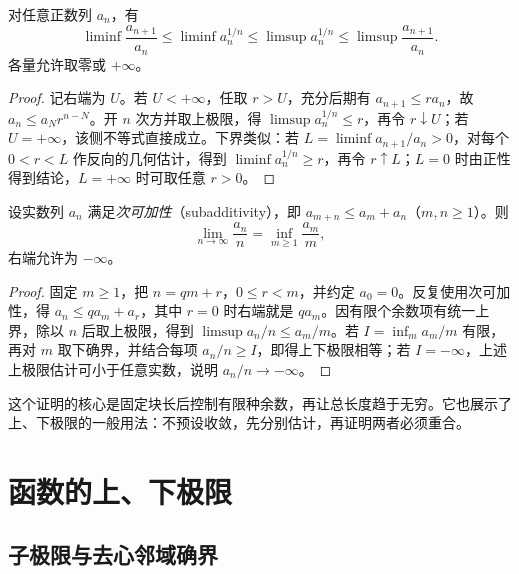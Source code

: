 \begin{proposition}
\label{prop:pei-ratio-root-limsup}
对任意正数列 $a_n$，有
\begin{equation}
    \liminf\frac{a_{n+1}}{a_n}
    \le\liminf a_n^{1/n}
    \le\limsup a_n^{1/n}
    \le\limsup\frac{a_{n+1}}{a_n}.
    \label{eq:pei-ratio-root-limsup}
\end{equation}
各量允许取零或 $+\infty$。
\end{proposition}
\begin{proof}
记右端为 $U$。若 $U<+\infty$，任取 $r>U$，充分后期有 $a_{n+1}\le r a_n$，故 $a_n\le a_Nr^{n-N}$。开 $n$ 次方并取上极限，得 $\limsup a_n^{1/n}\le r$，再令 $r\downarrow U$；若 $U=+\infty$，该侧不等式直接成立。下界类似：若 $L=\liminf a_{n+1}/a_n>0$，对每个 $0<r<L$ 作反向的几何估计，得到 $\liminf a_n^{1/n}\ge r$，再令 $r\uparrow L$；$L=0$ 时由正性得到结论，$L=+\infty$ 时可取任意 $r>0$。
\end{proof}

\begin{theorem}[次可加数列的平均极限]
\label{thm:pei-subadditive}
设实数列 $a_n$ 满足\emph{次可加性}（subadditivity），即 $a_{m+n}\le a_m+a_n$（$m,n\ge1$）。则
\begin{equation}
    \lim_{n\to\infty}\frac{a_n}{n}
       =\inf_{m\ge1}\frac{a_m}{m},
    \label{eq:pei-subadditive}
\end{equation}
右端允许为 $-\infty$。
\end{theorem}
\begin{proof}
固定 $m\ge1$，把 $n=qm+r$，$0\le r<m$，并约定 $a_0=0$。反复使用次可加性，得 $a_n\le qa_m+a_r$，其中 $r=0$ 时右端就是 $qa_m$。因有限个余数项有统一上界，除以 $n$ 后取上极限，得到 $\limsup a_n/n\le a_m/m$。若 $I=\inf_ma_m/m$ 有限，再对 $m$ 取下确界，并结合每项 $a_n/n\ge I$，即得上下极限相等；若 $I=-\infty$，上述上极限估计可小于任意实数，说明 $a_n/n\to-\infty$。
\end{proof}

这个证明的核心是固定块长后控制有限种余数，再让总长度趋于无穷。它也展示了上、下极限的一般用法：不预设收敛，先分别估计，再证明两者必须重合。

\section{函数的上、下极限}
\label{sec:pei-function-limsup}

\subsection{子极限与去心邻域确界}

